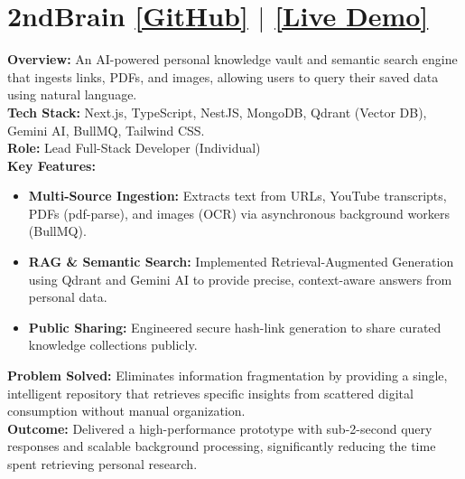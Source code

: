 \documentclass[11pt,a4paper]{article}
\begin{document}
\section*{2ndBrain \hfill \normalsize \href{https://github.com/your-username/2ndBrain}{[GitHub]} $|$ \href{https://2ndbrain-demo.vercel.app}{[Live Demo]}}

\textbf{Overview:} An AI-powered personal knowledge vault and semantic search engine that ingests links, PDFs, and images, allowing users to query their saved data using natural language. \\

\textbf{Tech Stack:} Next.js, TypeScript, NestJS, MongoDB, Qdrant (Vector DB), Gemini AI, BullMQ, Tailwind CSS. \\

\textbf{Role:} Lead Full-Stack Developer (Individual) \\

\textbf{Key Features:}
\begin{itemize}[leftmargin=*, noitemsep]
    \item \textbf{Multi-Source Ingestion:} Extracts text from URLs, YouTube transcripts, PDFs (pdf-parse), and images (OCR) via asynchronous background workers (BullMQ).
    \item \textbf{RAG \& Semantic Search:} Implemented Retrieval-Augmented Generation using Qdrant and Gemini AI to provide precise, context-aware answers from personal data.
    \item \textbf{Public Sharing:} Engineered secure hash-link generation to share curated knowledge collections publicly.
\end{itemize}

\textbf{Problem Solved:} Eliminates information fragmentation by providing a single, intelligent repository that retrieves specific insights from scattered digital consumption without manual organization. \\

\textbf{Outcome:} Delivered a high-performance prototype with sub-2-second query responses and scalable background processing, significantly reducing the time spent retrieving personal research.
\end{document}
